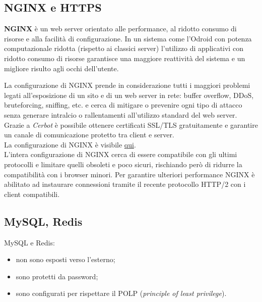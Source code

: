 \subsection{NGINX e HTTPS}
\textbf{NGINX} è un web server orientato alle performance, al ridotto consumo di risorse e alla facilità di configurazione.
In un sistema come l'Odroid con potenza computazionale ridotta (rispetto ai classici server) l'utilizzo di applicativi con ridotto consumo di risorse garantisce una maggiore reattività del sistema e un migliore risulto agli occhi dell'utente.

La configurazione di NGINX prende in considerazione tutti i maggiori problemi legati all'esposizione di un sito e di un web server in rete: buffer overflow, DDoS, bruteforcing, sniffing, etc. e cerca di mitigare o prevenire ogni tipo di attacco senza generare intralcio o rallentamenti all'utilizzo standard del web server.\\
Grazie a \textit{Cerbot} è possibile ottenere certificati SSL/TLS gratuitamente e garantire un canale di comunicazione protetto tra client e server.\\
La configurazione di NGINX è visibile \href{https://raw.githubusercontent.com/FedericoTorsello/Embedded/serverPHP/nginx.conf}{qui}.\\
L'intera configurazione di NGINX cerca di essere compatibile con gli ultimi protocolli e limitare quelli obsoleti e poco sicuri, rischiando però di ridurre la compatibilità con i browser minori. Per garantire ulteriori performance NGINX è abilitato ad instaurare connessioni tramite il recente protocollo HTTP/2 con i client compatibili.

\subsection{MySQL, Redis}
MySQL e Redis:
\begin{itemize}
	\item non sono esposti verso l'esterno;
	\item sono protetti da password;
	\item sono configurati per rispettare il POLP (\textit{principle of least privilege}).
\end{itemize}
